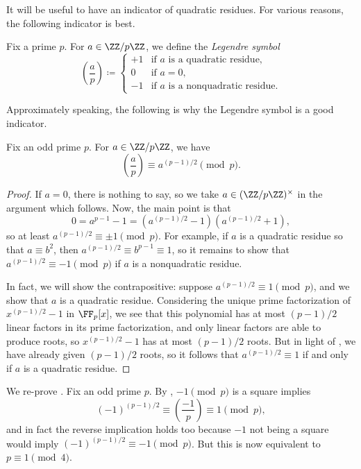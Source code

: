 \documentclass[../notes.tex]{subfiles}
\begin{document}
It will be useful to have an indicator of quadratic residues. For various reasons, the following indicator is best.
\begin{definition}
	Fix a prime $p$. For $a\in\ZZ/p\ZZ$, we define the \textit{Legendre symbol}
	\[\left(\frac ap\right)\coloneqq\begin{cases}
		+1 & \text{if }a\text{ is a quadratic residue}, \\
		0 & \text{if }a=0, \\
		-1 & \text{if }a\text{ is a nonquadratic residue}.
	\end{cases}\]
\end{definition}
Approximately speaking, the following is why the Legendre symbol is a good indicator.
\begin{proposition} \label{prop:euler-criterion}
	Fix an odd prime $p$. For $a\in\ZZ/p\ZZ$, we have
	\[\left(\frac ap\right)\equiv a^{(p-1)/2}\pmod p.\]
\end{proposition}
\begin{proof}
	If $a=0$, there is nothing to say, so we take $a\in(\ZZ/p\ZZ)^\times$ in the argument which follows. Now, the main point is that
	\[0=a^{p-1}-1=\left(a^{(p-1)/2}-1\right)\left(a^{(p-1)/2}+1\right),\]
	so at least $a^{(p-1)/2}\equiv\pm1\pmod p$. For example, if $a$ is a quadratic residue so that $a\equiv b^2$, then $a^{(p-1)/2}\equiv b^{p-1}\equiv1$, so it remains to show that $a^{(p-1)/2}\equiv-1\pmod p$ if $a$ is a nonquadratic residue.

	In fact, we will show the contrapositive: suppose $a^{(p-1)/2}\equiv1\pmod p$, and we show that $a$ is a quadratic residue. Considering the unique prime factorization of $x^{(p-1)/2}-1$ in $\FF_p[x]$, we see that this polynomial has at most $(p-1)/2$ linear factors in its prime factorization, and only linear factors are able to produce roots, so $x^{(p-1)/2}-1$ has at most $(p-1)/2$ roots. But in light of , we have already given $(p-1)/2$ roots, so it follows that $a^{(p-1)/2}\equiv1$ if and only if $a$ is a quadratic residue.
\end{proof}
\begin{example} \label{ex:leg-minus-one}
	We re-prove . Fix an odd prime $p$. By , $-1\pmod p$ is a square implies
	\[(-1)^{(p-1)/2}\equiv\left(\frac{-1}p\right)\equiv1\pmod p,\]
	and in fact the reverse implication holds too because $-1$ not being a square would imply $(-1)^{(p-1)/2}\equiv-1\pmod p$. But this is now equivalent to $p\equiv1\pmod4$.
\end{example}
\end{document}

